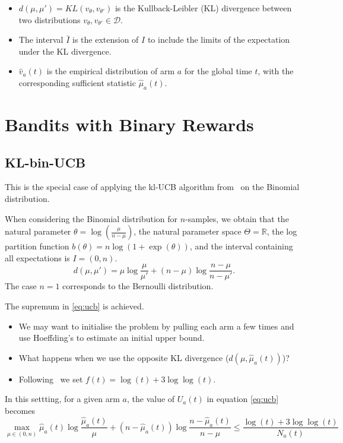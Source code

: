 \documentclass[a4paper,11pt]{article}
\newcommand{\RR}{\mathbb{R}}
\newcommand{\vhat}{\widehat{v}}
\newcommand{\muhat}{\widehat{\mu}}
\newcommand{\Dcal}{\mathcal{D}}
\begin{document}
\begin{itemize}
\item $d(\mu,\mu') = KL(v_\theta, v_{\theta'})$ is the
  Kullback-Leibler (KL) divergence between two distributions
  $v_\theta,v_{\theta'}\in\Dcal$.
\item The interval $\bar{I}$ is the extension of $I$ to include the limits of
  the expectation under the KL divergence.
\item $\vhat_a(t)$ is the empirical distribution of arm $a$ for the
  global time $t$, with the corresponding sufficient statistic
  $\muhat_a(t)$.
\end{itemize}

\section{Bandits with Binary Rewards}

\subsection{KL-bin-UCB}

This is the special case of applying the kl-UCB algorithm
from~\cite{cappe13kulucb} on the Binomial distribution.



When considering the Binomial distribution for $n$-samples, we obtain
that the natural parameter $\theta = \log\left(\frac{\mu}{n-\mu}\right)$, the natural
parameter space $\Theta = \RR$,
the log partition function $b(\theta) = n\log(1+\exp(\theta))$, and
the interval containing all expectations is $I=(0,n)$.
\[
d(\mu, \mu') = \mu \log \frac{\mu}{\mu'} + (n-\mu) \log\frac{n-\mu}{n-\mu'}.
\]
The case $n=1$ corresponds to the Bernoulli distribution.

The supremum in \eqref{eq:ucb} is achieved.

\begin{itemize}
\item We may want to initialise the problem by pulling each arm a few
  times and use Hoeffding's to estimate an initial upper bound.
\item What happens when we use the opposite KL divergence ($d(\mu, \muhat_a(t))$)?
\item Following~\cite[Theorem 1]{cappe13kulucb} we set $f(t) = \log(t)
  + 3\log\log(t)$.
\end{itemize}

In this settting, for a given arm $a$, the value of $U_a(t)$ in equation \eqref{eq:ucb} becomes
\begin{equation}
  \label{eq:ucb-binomial}
  \max_{\mu\in (0,n)} \muhat_a(t) \log \frac{\muhat_a(t)}{\mu} +
  (n-\muhat_a(t)) \log\frac{n-\muhat_a(t)}{n-\mu}
  \leqslant \frac{\log(t)+3\log\log(t)}{N_a(t)}
\end{equation}





\end{document}
